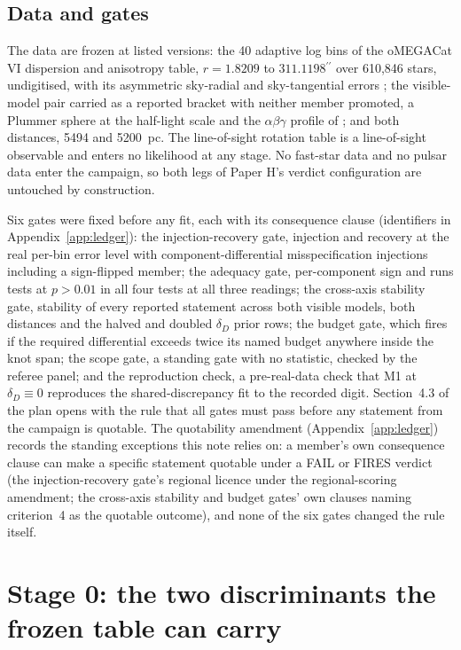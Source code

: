 \documentclass[11pt]{article}
\newcommand{\as}{\ensuremath{^{\prime\prime}}}
\newcommand{\dD}{\ensuremath{\delta_D}}
\begin{document}
\subsection{Data and gates}
\label{sec:data-gates}

The data are frozen at listed versions: the 40 adaptive log bins of the oMEGACat VI dispersion and anisotropy table, $r = 1.8209$ to $311.1198\as$ over 610{,}846 stars, undigitised, with its asymmetric sky-radial and sky-tangential errors \citep{Haberle2025oMEGACatVI}; the visible-model pair carried as a reported bracket with neither member promoted, a Plummer sphere at the \citet{BaumgardtHilker2018} half-light scale and the $\alpha\beta\gamma$ profile of \citet{BanaresHernandez2025}; and both distances, 5494 and 5200~pc. The line-of-sight rotation table \citep{Haberle2026LVM} is a line-of-sight observable and enters no likelihood at any stage. No fast-star data and no pulsar data enter the campaign, so both legs of Paper H's verdict configuration are untouched by construction.

Six gates were fixed before any fit, each with its consequence clause (identifiers in Appendix~\ref{app:ledger}): the injection-recovery gate, injection and recovery at the real per-bin error level with component-differential misspecification injections including a sign-flipped member; the adequacy gate, per-component sign and runs tests at $p > 0.01$ in all four tests at all three readings; the cross-axis stability gate, stability of every reported statement across both visible models, both distances and the halved and doubled \dD{} prior rows; the budget gate, which fires if the required differential exceeds twice its named budget anywhere inside the knot span; the scope gate, a standing gate with no statistic, checked by the referee panel; and the reproduction check, a pre-real-data check that M1 at $\dD \equiv 0$ reproduces the shared-discrepancy fit to the recorded digit. Section~4.3 of the plan opens with the rule that all gates must pass before any statement from the campaign is quotable. The quotability amendment (Appendix~\ref{app:ledger}) records the standing exceptions this note relies on: a member's own consequence clause can make a specific statement quotable under a FAIL or FIRES verdict (the injection-recovery gate's regional licence under the regional-scoring amendment; the cross-axis stability and budget gates' own clauses naming criterion~4 as the quotable outcome), and none of the six gates changed the rule itself.

\section{Stage 0: the two discriminants the frozen table can carry}
\label{sec:stage0}
\end{document}
